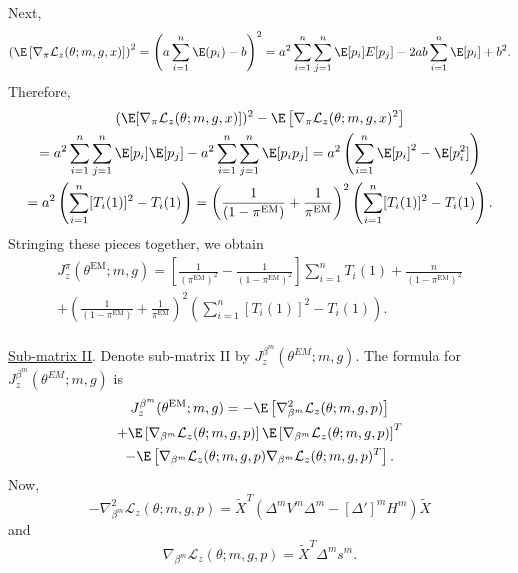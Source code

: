 \documentclass[12pt]{article}
\begin{document}
Next,
\begin{multline*}
\left( \E \left[\nabla_\pi \mathcal{L}_z(\theta; m, g, x) \right] \right)^2 = \left( a \sum_{i=1}^n \E (p_i) - b \right)^2 = a^2 \sum_{i=1}^n \sum_{j=1}^n \E[p_i]  E[p_j] - 2ab \sum_{i=1}^n \E[p_i] + b^2.
\end{multline*}
Therefore,
\begin{multline*} ( \E [\nabla_\pi \mathcal{L}_z(\theta; m, g, x)])^2 - \E \left[\nabla_\pi \mathcal{L}_z(\theta; m, g, x)^2 \right] \\ = a^2 \sum_{i=1}^n \sum_{j=1}^n \E[p_i] \E[p_j] - a^2 \sum_{i=1}^n \sum_{j=1}^n \E[p_i p_j] = a^2 \left( \sum_{i=1}^n \E[p_i]^2 - \E[p_i^2]\right) \\ = a^2 \left( \sum_{i=1}^n [T_i(1)]^2 - T_i(1) \right) = \left( \frac{1}{(1 - \pi^{\textrm{EM}})} + \frac{1}{\pi^{\textrm{EM}}} \right)^2 \left( \sum_{i=1}^n [T_i(1)]^2 - T_i(1) \right).
\end{multline*}
Stringing these pieces together, we obtain
\begin{multline}\label{sub_mat_1_formula}
J_z^\pi(\theta^{\textrm{EM}}; m, g) = 
\left[ \frac{1}{(\pi^{\textrm{EM}})^2} - \frac{1}{ (1 - \pi^{\textrm{EM}} )^2} \right] \sum_{i=1}^n T_i(1) + \frac{n}{(1-\pi^{\textrm{EM}} )^2} \\ + \left( \frac{1}{(1 - \pi^{\textrm{EM}} )} + \frac{1}{\pi^{\textrm{EM}}} \right)^2 \left( \sum_{i=1}^n [T_i(1)]^2 - T_i(1) \right).
\end{multline}
\\
\underline{Sub-matrix II}. Denote sub-matrix II by $J_z^{\beta^m}(\theta^{EM}; m, g).$ The formula for $J_z^{\beta^m}(\theta^{EM}; m, g)$ is
\begin{multline}\label{sub_mat_2}
J^{\beta^m}_z(\theta^\textrm{EM}; m, g) = -\E \left[\nabla_{\beta^m}^2 \mathcal{L}_z(\theta; m, g, p) \right] \\ + \E\left[\nabla_{\beta^m} \mathcal{L}_z(\theta; m, g, p) \right] \E\left[ \nabla_{\beta^m} \mathcal{L}_z(\theta; m, g, p) \right]^T \\ - \E\left[ \nabla_{\beta^m} \mathcal{L}_z(\theta; m, g, p) \nabla_{\beta^m} \mathcal{L}_z(\theta; m, g, p)^T  \right].
\end{multline}
Now,
$$ -\nabla_{\beta^m}^2 \mathcal{L}_z(\theta; m, g, p) = \tilde{X}^T ( \Delta^m V^m \Delta^m - [\Delta']^m H^m ) \tilde{X}$$ and $$\nabla_{\beta^m}\mathcal{L}_z(\theta; m, g, p) = \tilde{X}^T \Delta^m s^m.$$
\end{document}
